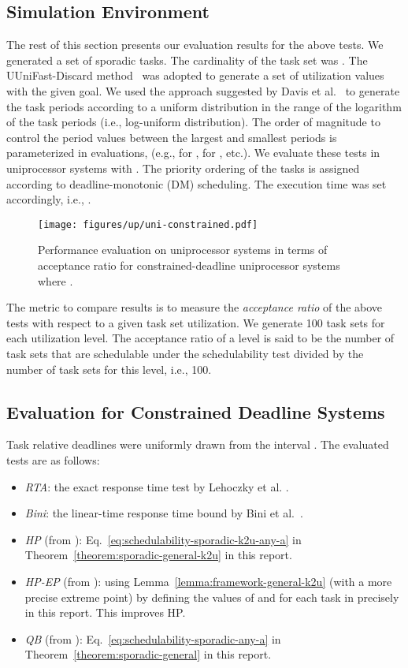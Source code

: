 \documentclass[10pt,conference]{IEEEtran}
\newcommand{\frameworkkq}[1]{}
\newcommand{\frameworkku}[1]{}
\begin{document}
\subsection{Simulation Environment}
\label{subsec:simulation-env}
The rest of this section presents our evaluation results for the above tests. 
We generated a set of sporadic tasks. The cardinality of the task set was .
The UUniFast-Discard method~\cite{davis2011improved} was adopted to generate a set of utilization values with the given goal.
We  used the approach suggested by Davis et
al.~\cite{davis2008efficient}
to generate the task periods according
to a uniform distribution in the range of the logarithm of the task periods (i.e.,
log-uniform distribution).  
The order of magnitude  to control the period values between the largest and smallest periods is parameterized in evaluations, (e.g.,  for ,  for , etc.). 
We evaluate these tests in uniprocessor systems with .
The priority ordering of the tasks is assigned according to deadline-monotonic (DM) scheduling. The execution time was set accordingly, i.e., .



\begin{figure*}[t]
   \centering
  \texttt{[image: figures/up/uni-constrained.pdf]}
  \caption{Performance evaluation on uniprocessor systems in terms of acceptance ratio for constrained-deadline uniprocessor systems where .}
    \label{fig:uni-1}
\end{figure*}

The metric to compare results is to measure the \emph{acceptance ratio} of the above tests with respect to a given task set utilization. 
We generate 100 task sets for each utilization level.
The acceptance ratio of a level is said to be the number of task sets that are schedulable under the schedulability test divided by the number of task sets for this level, i.e., 100. 


\subsection{Evaluation for Constrained Deadline Systems} 
Task relative deadlines were uniformly drawn from the interval .  
The evaluated  tests are as follows:
\begin{itemize}
\item \emph{RTA}: the exact response time test by Lehoczky et al. \cite{DBLP:conf/rtss/LehoczkySD89}.
\item \emph{Bini}: the linear-time response time bound by Bini et al.~\cite{bini2009response}.
\item \emph{HP} (from \frameworkku{}): Eq.~\eqref{eq:schedulability-sporadic-k2u-any-a} in Theorem~\ref{theorem:sporadic-general-k2u} in this report.
\item \emph{HP-EP} (from \frameworkku{}): using Lemma~\ref{lemma:framework-general-k2u}
  (with a more precise extreme point) by defining the values of
   and  for each task  in 
  precisely in this report. This improves HP.
\item \emph{QB} (from \frameworkkq{}): Eq.~\eqref{eq:schedulability-sporadic-any-a} in Theorem~\ref{theorem:sporadic-general} in this report.
\end{itemize}
\end{document}
